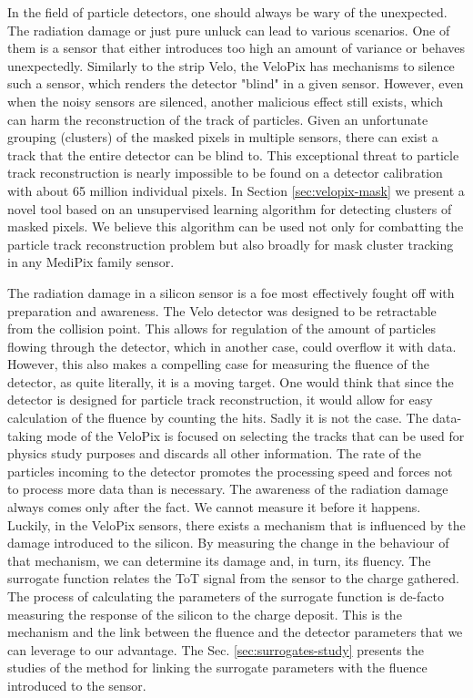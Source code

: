 In the field of particle detectors, one should always be wary of the unexpected. 
The radiation damage or just pure unluck can lead to various scenarios. One of them is a sensor that either introduces too high an amount of variance or behaves unexpectedly.
Similarly to the strip Velo, the VeloPix has mechanisms to silence such a sensor, which renders the detector "blind" in a given sensor.
However, even when the noisy sensors are silenced, another malicious effect still exists, which can harm the reconstruction of the track of particles.
Given an unfortunate grouping (clusters) of the masked pixels in multiple sensors, there can exist a track that the entire detector can be blind to.
This exceptional threat to particle track reconstruction is nearly impossible to be found on a detector calibration with about 65 million individual pixels.
In Section \ref{sec:velopix-mask} we present a novel tool based on an unsupervised learning algorithm for detecting clusters of masked pixels.
We believe this algorithm can be used not only for combatting the particle track reconstruction problem but also broadly for mask cluster tracking in any MediPix family sensor.


The radiation damage in a silicon sensor is a foe most effectively fought off with preparation and awareness.
The Velo detector was designed to be retractable from the collision point. 
This allows for regulation of the amount of particles flowing through the detector, which in another case, could overflow it with data.
However, this also makes a compelling case for measuring the fluence of the detector, as quite literally, it is a moving target.
One would think that since the detector is designed for particle track reconstruction, it would allow for easy calculation of the fluence by counting the hits.
Sadly it is not the case.
The data-taking mode of the VeloPix is focused on selecting the tracks that can be used for physics study purposes and discards all other information.
The rate of the particles incoming to the detector promotes the processing speed and forces not to process more data than is necessary.
The awareness of the radiation damage always comes only after the fact. We cannot measure it before it happens.
Luckily, in the VeloPix sensors, there exists a mechanism that is influenced by the damage introduced to the silicon.
By measuring the change in the behaviour of that mechanism, we can determine its damage and, in turn, its fluency.
The surrogate function relates the ToT signal from the sensor to the charge gathered.
The process of calculating the parameters of the surrogate function is de-facto measuring the response of the silicon to the charge deposit. 
This is the mechanism and the link between the fluence and the detector parameters that we can leverage to our advantage.
The Sec. \ref{sec:surrogates-study} presents the studies of the method for linking the surrogate parameters with the fluence introduced to the sensor.


